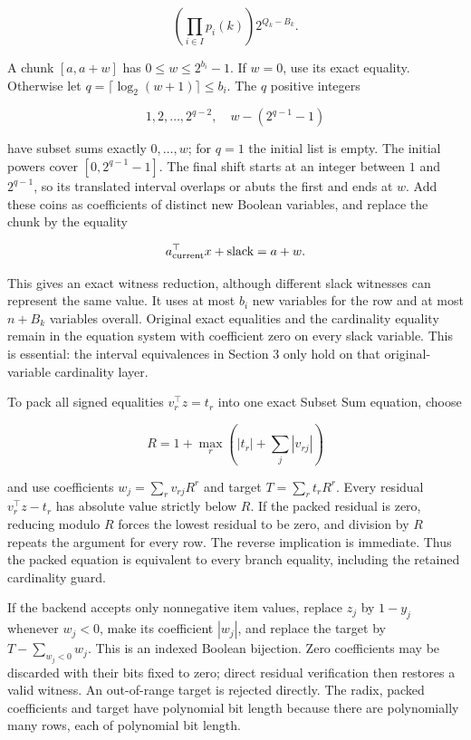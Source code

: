 \[
\left(\prod_{i\in I}p_i(k)\right)2^{Q_k-B_k}.
\]

A chunk \([a,a+w]\) has \(0\le w\le2^{b_i}-1\). If \(w=0\), use its exact equality. Otherwise let \(q=\lceil\log_2(w+1)\rceil\le b_i\). The \(q\) positive integers

\[
1,2,\ldots,2^{q-2},\quad w-(2^{q-1}-1)
\]

have subset sums exactly \(0,\ldots,w\); for \(q=1\) the initial list is empty. The initial powers cover \([0,2^{q-1}-1]\). The final shift starts at an integer between \(1\) and \(2^{q-1}\), so its translated interval overlaps or abuts the first and ends at \(w\). Add these coins as coefficients of distinct new Boolean variables, and replace the chunk by the equality

\[
a_{\rm current}^{\top}x+\text{slack}=a+w.
\]

This gives an exact witness reduction, although different slack witnesses can represent the same value. It uses at most \(b_i\) new variables for the row and at most \(n+B_k\) variables overall. Original exact equalities and the cardinality equality remain in the equation system with coefficient zero on every slack variable. This is essential: the interval equivalences in Section 3 only hold on that original-variable cardinality layer.

To pack all signed equalities \(v_r^\top z=t_r\) into one exact Subset Sum equation, choose

\[
R=1+\max_r\left(|t_r|+\sum_j|v_{rj}|\right)
\]

and use coefficients \(w_j=\sum_r v_{rj}R^r\) and target \(T=\sum_r t_rR^r\). Every residual \(v_r^\top z-t_r\) has absolute value strictly below \(R\). If the packed residual is zero, reducing modulo \(R\) forces the lowest residual to be zero, and division by \(R\) repeats the argument for every row. The reverse implication is immediate. Thus the packed equation is equivalent to every branch equality, including the retained cardinality guard.

If the backend accepts only nonnegative item values, replace \(z_j\) by \(1-y_j\) whenever \(w_j<0\), make its coefficient \(|w_j|\), and replace the target by \(T-\sum_{w_j<0}w_j\). This is an indexed Boolean bijection. Zero coefficients may be discarded with their bits fixed to zero; direct residual verification then restores a valid witness. An out-of-range target is rejected directly. The radix, packed coefficients and target have polynomial bit length because there are polynomially many rows, each of polynomial bit length.


